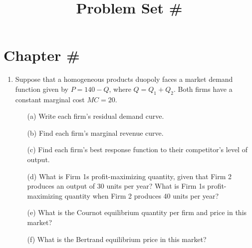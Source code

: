 \documentclass[11pt]{article}
\title{Problem Set \#}
\begin{document}
  
\section*{Chapter \#}

\begin{enumerate}
  \item Suppose that a homogeneous products duopoly faces a market demand function given by $P=140-Q$, where $Q=Q_{1}+Q_{2}$. Both firms have a constant marginal cost $M C=20$.     
  
  \begin{enumerate}
    \item[(a)] Write each firm's residual demand curve.

    \item[(b)] Find each firm's marginal revenue curve.

    \item[(c)] Find each firm's best response function to their competitor's level of output.

    \item[(d)] What is Firm 1s profit-maximizing quantity, given that Firm 2 produces an output of 30 units per year? What is Firm 1s profit-maximizing quantity when Firm 2 produces 40 units per year?

    \item[(e)] What is the Cournot equilibrium quantity per firm and price in this market?

    \item[(f)] What is the Bertrand equilibrium price in this market?
  \end{enumerate}
\end{enumerate}
\end{document}
